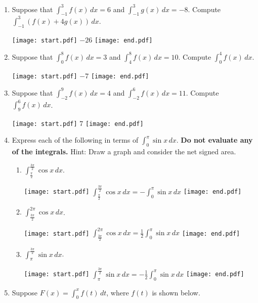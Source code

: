 \documentclass[12pt]{article}
\begin{document}
\begin{enumerate}
\item Suppose that $\int_{-1}^3{f(x)} \,dx=6$ and $\int_{-1}^{3}{g(x)} \,dx=-8$.  Compute $\int_{-1}^3{(f(x)+4g(x))} \,dx$.

\texttt{[image: start.pdf]}
{{$-26$}}
\texttt{[image: end.pdf]}


\item Suppose that $\int_0^8{f(x)} \,dx=3$ and $\int_4^{8}{f(x)} \,dx=10$.  Compute $\int_0^4{f(x)} \,dx$.

\texttt{[image: start.pdf]}
{{$-7$}}
\texttt{[image: end.pdf]}


\item Suppose that $\int_{-2}^9{f(x)} \,dx=4$ and $\int_{-2}^{6}{f(x)} \,dx=11$.  Compute $\int_{9}^6{f(x)} \,dx$.

\texttt{[image: start.pdf]}
{{$7$}}
\texttt{[image: end.pdf]}


\item Express each of the following in terms of $\int_0^{\pi}\sin{x} \,dx$.  {\bf Do not evaluate any of the integrals.}  Hint: Draw a graph and consider the net signed area.

\begin{enumerate}

\item $\int_{\frac{\pi}{2}}^{\frac{3\pi}{2}}\cos{x} \,dx$.

\texttt{[image: start.pdf]}
{{$\int_{\frac{\pi}{2}}^{\frac{3\pi}{2}}\cos{x} \,dx=-\int_0^{\pi}\sin{x} \,dx$}}
\texttt{[image: end.pdf]}


\item $\int_{\frac{3\pi}{2}}^{2\pi}\cos{x} \,dx$.

\texttt{[image: start.pdf]}
{{$\int_{\frac{3\pi}{2}}^{2\pi}\cos{x} \,dx=\frac{1}{2}\int_0^{\pi}\sin{x} \,dx$}}
\texttt{[image: end.pdf]}


\item $\int_{\pi}^{\frac{3\pi}{2}}\sin{x} \,dx$.

\texttt{[image: start.pdf]}
{{$\int_{\pi}^{\frac{3\pi}{2}}\sin{x} \,dx=-\frac{1}{2}\int_0^{\pi}\sin{x} \,dx$}}
\texttt{[image: end.pdf]}


\end{enumerate}

\item Suppose $F(x)=\int_0^x{f(t)} \,dt$, where $f(t)$ is shown below.


\end{enumerate}
\end{document}
